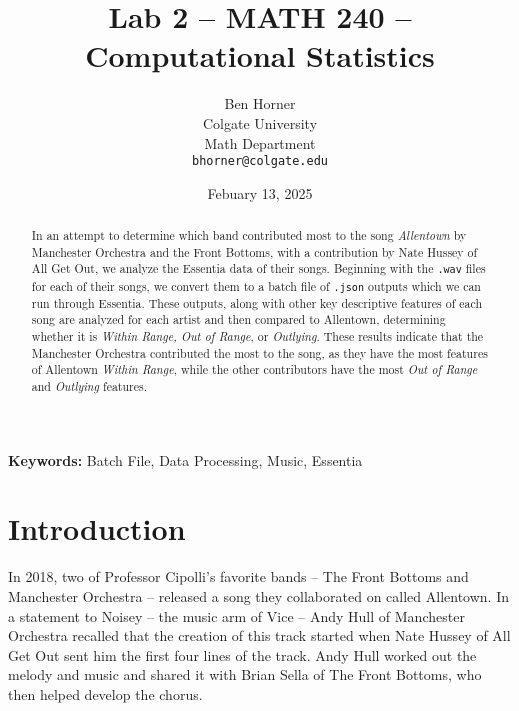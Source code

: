 \documentclass{article}\usepackage[]{graphicx}\usepackage[]{xcolor}
\begin{document}
\vspace{-1in}
\title{Lab 2 -- MATH 240 -- Computational Statistics}

\author{
  Ben Horner \\
  Colgate University  \\
  Math Department  \\
  {\tt bhorner@colgate.edu}
}

\date{Febuary 13, 2025}

\maketitle

\begin{multicols}{2}
\begin{abstract}
In an attempt to determine which band contributed most to the song \emph{Allentown} by Manchester Orchestra and the Front Bottoms, with a contribution by Nate Hussey of All Get Out, we analyze the Essentia data of their songs. Beginning with the \texttt{.wav} files for each of their songs, we convert them to a batch file of \texttt{.json} outputs which we can run through Essentia. These outputs, along with other key descriptive features of each song are analyzed for each artist and then compared to Allentown, determining whether it is \emph{Within Range, Out of Range}, or \emph{Outlying}. These results indicate that the Manchester Orchestra contributed the most to the song, as they have the most features of Allentown \emph{Within Range}, while the other contributors have the most \emph{Out of Range} and \emph{Outlying} features.

\end{abstract}

\noindent \textbf{Keywords:} Batch File, Data Processing, Music, Essentia

\section{Introduction}
  In 2018, two of Professor Cipolli's favorite bands -- The Front Bottoms and Manchester Orchestra -- released a song they collaborated on called Allentown. In a statement to Noisey --  the music arm of Vice -- Andy Hull of Manchester Orchestra recalled that the creation of this track started when Nate Hussey of All Get Out sent him the first four lines of the track. Andy Hull worked out the melody and music and shared it with Brian Sella of The Front Bottoms, who then helped develop the chorus.


\end{multicols}
\end{document}
